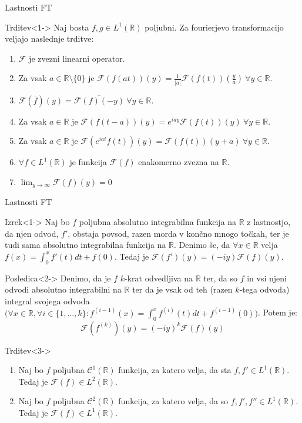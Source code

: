 \documentclass[t, 8pt]{beamer} %
\newcommand{\abs}[1]{\ensuremath{\lvert #1 \rvert}}
\newcommand{\mth}[1]{\ensuremath{\mathbb{#1}}}
\newcommand{\R}{\mth{R}}
\newcommand{\fillblack}[1]{
	\begin{tikzpicture}[remember picture, overlay]
		\node [shift={(0 cm,0cm)}]  at (current page.south west)
		{%
			\begin{tikzpicture}[remember picture, overlay] at (current page.south west)
				\draw [fill=black] (0, 0) -- (0,#1 \paperheight) --
				(\paperwidth,#1 \paperheight) -- (\paperwidth,0) -- cycle ;
			\end{tikzpicture}
		};
		\draw (current page.north west) rectangle (current page.south east);
	\end{tikzpicture}
}
\begin{document}
		\begin{frame}{Lastnosti FT}
			\begin{block}{Trditev}<1->
				Naj bosta $f, g\in L^1(\R)$ poljubni. Za fourierjevo transformacijo veljajo naslednje trditve: \begin{enumerate}
					\item $\mathcal{F}$ je zvezni linearni operator.
					\item Za vsak $a\in\R\setminus\{0\}$ je $\mathcal{F}(f(at))(y) = \frac{1}{\abs{a}}\mathcal{F}(f(t))(\frac{y}{a})~\forall y\in\R$.
					\item $\mathcal{F}(\bar{f})(y) = \overline{\mathcal{F}(f)(-y)}~\forall y\in\R$.
					\item Za vsak $a\in\R$ je $\mathcal{F}(f(t-a))(y)= e^{iay}\mathcal{F}(f(t))(y)~\forall y\in\R$.
					\item Za vsak $a\in\R$ je $\mathcal{F}(e^{iat}f(t))(y) = \mathcal{F}(f(t))(y+a)~\forall y\in\R$.
					\item $\forall f\in L^1(\R)$ je funkcija $\mathcal{F}(f)$ enakomerno zvezna na $\R$.
					\item $\lim_{y\to\infty}\mathcal{F}(f)(y) = 0$
				\end{enumerate}
			\end{block}
		\end{frame}
		
		\begin{frame}{Lastnosti FT}
			\begin{block}{Izrek}<1->
				Naj bo $f$ poljubna absolutno integrabilna funkcija na $\R$ z lastnostjo, da njen odvod, $f'$, obstaja povsod, razen morda v končno mnogo točkah, ter je tudi sama absolutno integrabilna funkcija na $\R$. Denimo še, da $\forall x\in \R$ velja $f(x) = \int_0^x f'(t)dt + f(0)$. Tedaj je $\mathcal{F}(f')(y) = (-iy)\mathcal{F}(f)(y)$.
			\end{block}
			\begin{block}{Posledica}<2->
				Denimo, da je $f$ $k$-krat odvedljiva na $\R$ ter, da so $f$ in vsi njeni odvodi absolutno integrabilni na $\R$ ter da je vsak od teh (razen $k$-tega odvoda) integral svojega odvoda $\big(\forall x\in\R, \forall i\in \{1, \ldots, k\}: f^{(i-1)}(x) = \int_{0}^{x}f^{(i)}(t)dt + f^{(i-1)}(0)\big)$. Potem je: $$\mathcal{F}(f^{(k)})(y) = (-iy)^k\mathcal{F}(f)(y)$$
			\end{block}
			\begin{block}{Trditev}<3->
				\begin{enumerate}
					\item Naj bo $f$ poljubna $\mathcal{C}^1(\R)$ funkcija, za katero velja, da sta $f, f'\in L^1(\R)$. Tedaj je $\mathcal{F}(f) \in L^2(\R)$.
					\item Naj bo $f$ poljubna $\mathcal{C}^2(\R)$ funkcija, za katero velja, da so $f, f', f''\in L^1(\R)$. Tedaj je $\mathcal{F}(f) \in L^1(\R)$.
				\end{enumerate}
			\end{block}
		\end{frame}
		
\end{document}
